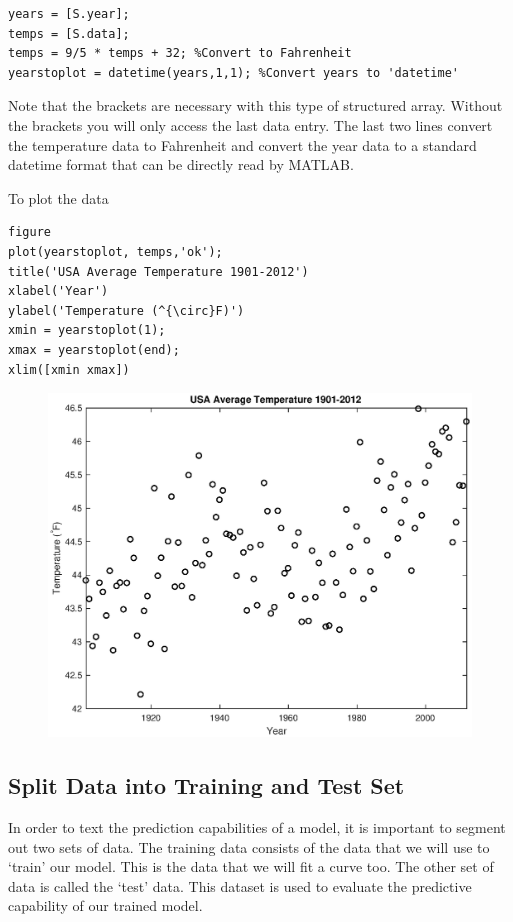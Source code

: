 \documentclass[12pt]{article}
\begin{document}
\begin{lstlisting}[frame=single]
years = [S.year];
temps = [S.data];
temps = 9/5 * temps + 32; %Convert to Fahrenheit
yearstoplot = datetime(years,1,1); %Convert years to 'datetime'
\end{lstlisting}

Note that the brackets are necessary with this type of structured array. Without the brackets you will only access the last data entry. The last two lines convert the temperature data to Fahrenheit and convert the year data to a standard datetime format that can be directly read by MATLAB.

To plot the data

\begin{lstlisting}[frame=single]
%Plot data 
figure
plot(yearstoplot, temps,'ok');
title('USA Average Temperature 1901-2012')
xlabel('Year')
ylabel('Temperature (^{\circ}F)')
xmin = yearstoplot(1);
xmax = yearstoplot(end);
xlim([xmin xmax])

\end{lstlisting}

\begin{figure}[H]
\centering
\includegraphics[width=0.75\linewidth]{matlab/dataTemp/tempVsYearAll.eps}
\end{figure}

\subsection{Split Data into Training and Test Set}
In order to text the prediction capabilities of a model, it is important to segment out two sets of data. The training data consists of the data that we will use to `train' our model. This is the data that we will fit a curve too. The other set of data is called the `test' data. This dataset is used to evaluate the predictive capability of our trained model. 
\end{document}
